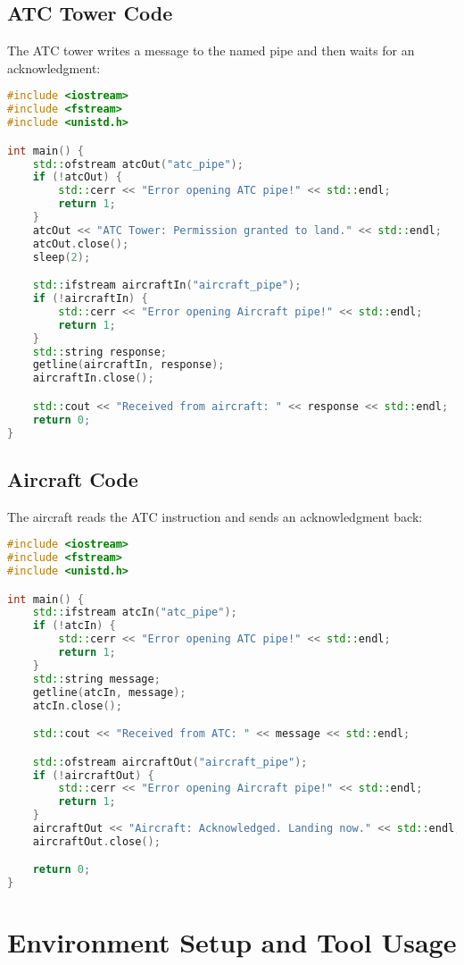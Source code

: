 \documentclass[conference]{IEEEtran}
\begin{document}
\subsection{ATC Tower Code}
The ATC tower writes a message to the named pipe and then waits for an acknowledgment:
\begin{lstlisting}[language=C++, caption=ATC Tower Sending Message]
#include <iostream>
#include <fstream>
#include <unistd.h>

int main() {
    std::ofstream atcOut("atc_pipe");
    if (!atcOut) {
        std::cerr << "Error opening ATC pipe!" << std::endl;
        return 1;
    }
    atcOut << "ATC Tower: Permission granted to land." << std::endl;
    atcOut.close();
    sleep(2);

    std::ifstream aircraftIn("aircraft_pipe");
    if (!aircraftIn) {
        std::cerr << "Error opening Aircraft pipe!" << std::endl;
        return 1;
    }
    std::string response;
    getline(aircraftIn, response);
    aircraftIn.close();

    std::cout << "Received from aircraft: " << response << std::endl;
    return 0;
}
\end{lstlisting}

\subsection{Aircraft Code}
The aircraft reads the ATC instruction and sends an acknowledgment back:
\begin{lstlisting}[language=C++, caption=Aircraft Receiving and Responding]
#include <iostream>
#include <fstream>
#include <unistd.h>

int main() {
    std::ifstream atcIn("atc_pipe");
    if (!atcIn) {
        std::cerr << "Error opening ATC pipe!" << std::endl;
        return 1;
    }
    std::string message;
    getline(atcIn, message);
    atcIn.close();

    std::cout << "Received from ATC: " << message << std::endl;

    std::ofstream aircraftOut("aircraft_pipe");
    if (!aircraftOut) {
        std::cerr << "Error opening Aircraft pipe!" << std::endl;
        return 1;
    }
    aircraftOut << "Aircraft: Acknowledged. Landing now." << std::endl;
    aircraftOut.close();

    return 0;
}
\end{lstlisting}

\section{Environment Setup and Tool Usage}
\end{document}
